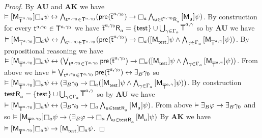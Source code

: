 \begin{proof}
By {\bf AU} and {\bf AK} we have $\entails \actionA{\aPModel{\aPStatesT[\agentA, \gamma_0]}} \necessaryA \psi \iff \bigwedge_{\aStateT[\agentA, \gamma_0] \in \aStatesT[\agentA, \gamma_0]} (\aPrecondition(\aPStateT[\agentA, \gamma_0]) \implies \necessaryA \bigwedge_{\aStateU \in \aSuccessorsA{\aPStateT[\agentA, \gamma_0]}} \actionA{\aPModel{\aStateU}} \psi)$.
By construction for every $\aStateT[\agentA, \gamma_0] \in \aStatesT[\agentA, \gamma_0]$ we have $\aSuccessorsA{\aPStateT[\agentA, \gamma_0]} = \{\aStateTest\} \cup \bigcup_{\gamma \in \Gamma_\agentA} \aPStatesT[\agentA, \gamma]$ so by {\bf AU} we have $\entails \actionA{\aPModel{\aPStatesT[\agentA, \gamma_0]}} \necessaryA \psi \iff \bigwedge_{\aStateT[\agentA, \gamma_0] \in \aStatesT[\agentA, \gamma_0]} (\aPrecondition(\aPStateT[\agentA, \gamma_0]) \implies \necessaryA (\actionA{\aPModel{\aStateTest}} \psi \land \bigwedge_{\gamma \in \Gamma_\agentA} \actionA{\aPModel{\aPStatesT[\agentA, \gamma]}} \psi))$.
By propositional reasoning we have $\entails \actionA{\aPModel{\aPStatesT[\agentA, \gamma_0]}} \necessaryA \psi \iff (\bigvee_{\aStateT[\agentA, \gamma_0] \in \aStatesT[\agentA, \gamma_0]} \aPrecondition(\aPStateT[\agentA, \gamma_0]) \implies \necessaryA (\actionA{\aPModel{\aStateTest}} \psi \land \bigwedge_{\gamma \in \Gamma_\agentA} \actionA{\aPModel{\aPStatesT[\agentA, \gamma]}} \psi))$.
From above we have $\entails \bigvee_{\aStateT[\agentA, \gamma_0] \in \aStatesT[\agentA, \gamma_0]} \aPrecondition(\aPStateT[\agentA, \gamma_0]) \iff \someactsBs \gamma_0$
so $\entails \actionA{\aPModel{\aPStatesT[\agentA, \gamma_0]}} \necessaryA \psi \iff (\someactsBs \gamma_0 \implies \necessaryA (\actionA{\aPModel{\aStateTest}} \psi \land \bigwedge_{\gamma \in \Gamma_\agentA} \actionA{\aPModel{\aPStatesT[\agentA, \gamma]}} \psi))$.
By construction $\aSuccessorsA{\aStateTest} = \{\aStateTest\} \cup \bigcup_{\gamma \in \Gamma_\agentA} \aPStatesT[\agentA, \gamma]$ so by {\bf AU} we have $\entails \actionA{\aPModel{\aPStatesT[\agentA, \gamma_0]}} \necessaryA \psi \iff (\someactsBs \gamma_0 \implies \necessaryA \bigwedge_{\aStateU \in \aSuccessorsA{\aStateTest}} \actionA{\aPModel{\aStateU}} \psi)$.
From above $\entails \someactsBs \phi \implies \someactsBs \gamma_0$ and so $\entails \actionA{\aPModel{\aPStatesT[\agentA, \gamma_0]}} \necessaryA \psi \implies (\someactsBs \phi \implies \necessaryA \bigwedge_{\aStateU \in \aSuccessorsA{\aStateTest}} \actionA{\aPModel{\aStateU}} \psi)$
By {\bf AK} we have $\entails \actionA{\aPModel{\aPStatesT[\agentA, \gamma_0]}} \necessaryA \psi \implies \actionA{\aPModel{\aStateTest}} \necessaryA \psi$.


\end{proof}
